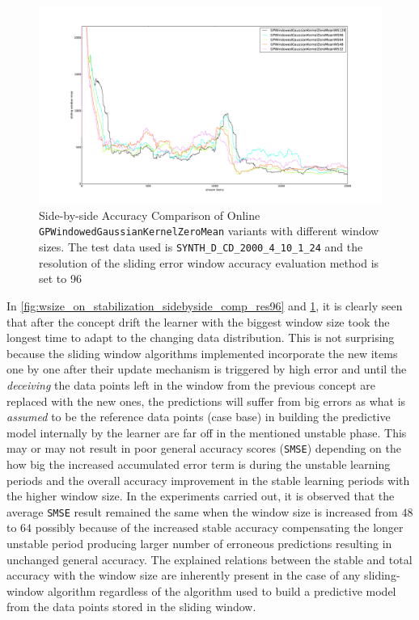 \begin{figure}[htbp]
  \centering
    \includegraphics[width=\linewidth]{./Figures/wsize_on_stabilization2_sidebyside_comp_res96.pdf}
  \caption{Side-by-side Accuracy Comparison of Online \texttt{GPWindowedGaussianKernelZeroMean} variants with different window sizes. The test data used is \texttt{SYNTH\_D\_CD\_2000\_4\_10\_1\_24} and the resolution of the sliding error window accuracy evaluation method is set to 96}
 \label{fig:wsize_on_stabilization2_sidebyside_comp_res96}
\end{figure}

In \ref{fig:wsize_on_stabilization_sidebyside_comp_res96} and \ref{fig:wsize_on_stabilization2_sidebyside_comp_res96}, it is clearly seen that after the concept drift the learner with the biggest window size took the longest time to adapt to the changing data distribution. This is not surprising because the sliding window algorithms implemented incorporate the new items one by one after their update mechanism is triggered by high error and until the \textit{deceiving} the data points left in the window from the previous concept are replaced with the new ones, the predictions will suffer from big errors as what is \textit{assumed} to be the reference data points (case base) in building the predictive model internally by the learner are far off in the mentioned unstable phase. This may or may not result in poor general accuracy scores (\texttt{SMSE}) depending on the how big the increased accumulated error term is during the unstable learning periods and the overall accuracy improvement in the stable learning periods with the higher window size. In the experiments carried out, it is observed that the average \texttt{SMSE} result remained the same when the window size is increased from $48$ to $64$ possibly because of the increased stable accuracy compensating the longer unstable period producing larger number of erroneous predictions resulting in unchanged general accuracy. The explained relations between the stable and total accuracy with the window size are inherently present in the case of any sliding-window algorithm regardless of the algorithm used to build a predictive model from the data points stored in the sliding window. 

